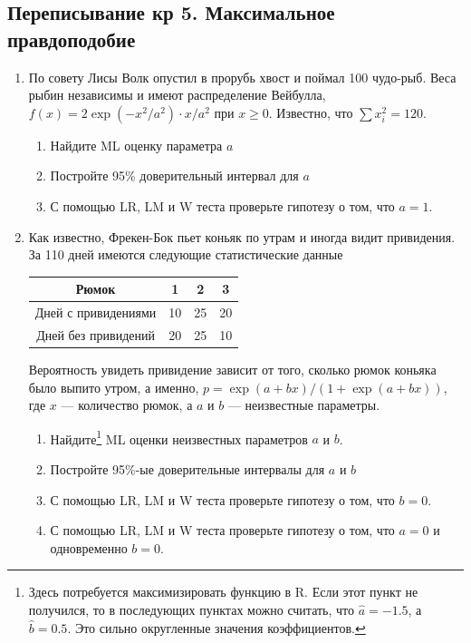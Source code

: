 \documentclass[12pt, a4paper]{article}\usepackage[]{graphicx}\usepackage[]{color}
\begin{document}
\subsection{Переписывание кр 5. Максимальное правдоподобие}

\begin{enumerate}
\item  По совету Лисы Волк опустил в прорубь хвост и поймал 100 чудо-рыб. Веса рыбин независимы и имеют распределение Вейбулла, $f(x)=2\exp(-x^2/a^2)\cdot x/a^2$ при $x\geq 0$. Известно, что $\sum x_i^2=120$.
\begin{enumerate}
\item Найдите ML оценку параметра $a$
\item Постройте 95\% доверительный интервал для $a$
\item С помощью LR, LM и W теста проверьте гипотезу о том, что $a=1$.
\end{enumerate}

\item Как известно, Фрекен-Бок пьет коньяк по утрам и иногда видит привидения. За 110 дней имеются следующие статистические данные


\begin{tabular}{c|ccc}
Рюмок & 1 & 2 & 3 \\
\hline
Дней с привидениями & 10 & 25 & 20 \\
Дней без привидений & 20 &  25 & 10 \\
\end{tabular}

Вероятность увидеть привидение зависит от того, сколько рюмок коньяка было выпито утром, а именно, $p=\exp(a+bx)/(1+ \exp(a+bx))$, где $x$ — количество рюмок, а $a$ и $b$ — неизвестные параметры.
\begin{enumerate}
\item Найдите\footnote{Здесь потребуется максимизировать функцию в R. Если этот пункт не получился, то в последующих пунктах можно считать, что $\hat{a}=-1.5$, а $\hat{b}=0.5$. Это сильно округленные значения коэффициентов.} ML оценки неизвестных параметров $a$ и $b$.
\item Постройте 95\%-ые доверительные интервалы для $a$ и $b$
\item С помощью LR, LM и W теста проверьте гипотезу о том, что $b=0$.
\item С помощью LR, LM и W теста проверьте гипотезу о том, что $a=0$ и одновременно $b=0$.
\end{enumerate}

\end{enumerate}
\end{document}

